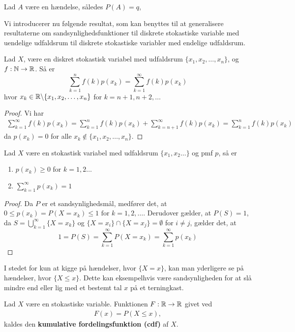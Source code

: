 \begin{example}
  Lad $A$ være en hændelse, således $P(A) = q$,
\end{example}
Vi introducerer nu følgende resultat, som kan benyttes til at generalisere resultaterne om sandsynlighedsfunktioner til diskrete stokastiske variable med uendelige udfaldsrum til diskrete stokastiske variabler med endelige udfaldsrum.
\begin{lem}
Lad $X$, være en diskret stokastisk variabel med udfaldsrum $\{x_1, x_2, \ldots, x_n\}$, og $f: \mathbb{N} \to \mathbb{R}$. Så er 
\begin{equation*}
    \sum^n_{k = 1} f(k) p(x_k) = \sum^\infty_{k = 1} f(k) p(x_k)
\end{equation*}
hvor $x_k \in \mathbb{R} \backslash \{x_1, x_2, \ldots, x_n\}$ for $k = n + 1, n + 2, \ldots$
\end{lem}
\begin{proof}
Vi har 
\begin{align*}
    \sum^\infty_{k = 1} f(k) p(x_k) =\sum^n_{k = 1} f(k) p(x_k) + \sum^\infty_{k = n + 1} f(k) p(x_k) = \sum^n_{k = 1} f(k) p(x_k) 
\end{align*}
da $p(x_k) = 0$ for alle $x_k \not \in \{x_1, x_2, \ldots, x_n\}$.
\end{proof}

\begin{prop}\label{prop:kravTilPMF}\label{prop:pmfEgenskaber} %
Lad $X$ være en stokastisk variabel med udfaldsrum $\{x_1, x_2\ldots\}$ og pmf $p$, så er 
\begin{enumerate}
    \item $p(x_k) \geq 0$ for $k=1,2 \ldots$
    \item $\displaystyle \sum_{k=1}^{\infty} p(x_k) = 1 $
\end{enumerate}
\end{prop}
\begin{proof}
Da $P$ er et sandsynlighedsmål, medfører det, at $0 \leq p(x_k) = P(X = x_k) \leq 1 \text{ for } k=1,2,\ldots$. Derudover gælder, at $P(S)=1$, da $S = \bigcup^\infty_{k = 1} \{X=x_k\}$ og $\{X=x_i\} \cap \{X=x_j\} = \emptyset$ for $i \neq j$, gælder det, at
\begin{equation*}
    1 = P(S) = \sum^\infty_{k = 1} P(X=x_k) = \sum_{k=1}^\infty p(x_k)
\end{equation*}
\end{proof}
I stedet for kun at kigge på hændelser, hvor $\{ X=x \}$, kan man yderligere se på hændelser, hvor $\{X \leq x \}$. Dette kan eksempelhvis være sandsynligheden for at slå mindre end eller lig med et bestemt tal $x$ på et terningkast. 
\begin{defn} %
Lad $X$ være en stokastiske variable. Funktionen $F: \mathbb{R} \to \mathbb{R}$ givet ved
\begin{align*}
    F(x)=P(X\leq x), 
\end{align*}
kaldes den \textbf{kumulative fordelingsfunktion (cdf)} af $X$.
\end{defn}

